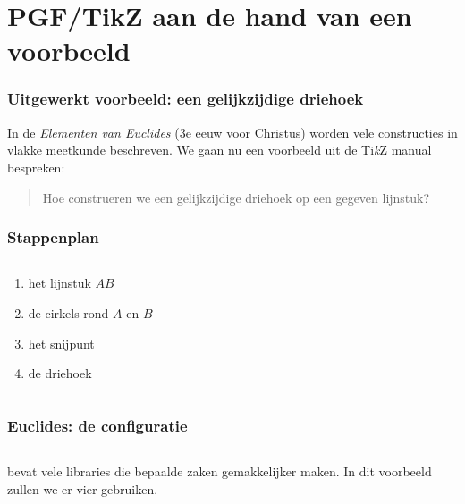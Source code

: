 \section{PGF/TikZ aan de hand van een voorbeeld}

\begin{frame}
  \frametitle{Uitgewerkt voorbeeld: een gelijkzijdige driehoek}

  In de \emph{Elementen van Euclides} (3e eeuw voor Christus) worden vele constructies in vlakke meetkunde beschreven. We gaan nu een voorbeeld uit de Ti\textit{k}Z manual bespreken:
  \begin{quote}
    Hoe construeren we een gelijkzijdige driehoek op een gegeven lijnstuk?
  \end{quote}

  \pause
  \centering
  
\end{frame}

\begin{frame}
  \frametitle{Stappenplan}

  \begin{columns}
    \begin{column}{.5\textwidth}
      \begin{enumerate}
        \item het lijnstuk $AB$
        \item de cirkels rond $A$ en $B$
        \item het snijpunt
        \item de driehoek
      \end{enumerate}
    \end{column}
    \begin{column}{.5\textwidth}
      \centering
      
    \end{column}
  \end{columns}
\end{frame}

\begin{frame}
  \frametitle{Euclides: de configuratie}
  
  \inputminted[fontsize = \scriptsize]{latex}{tikz/triangle/configuration.tikz}

  \TikZ bevat vele libraries die bepaalde zaken gemakkelijker maken. In dit voorbeeld zullen we er vier gebruiken.
\end{frame}

